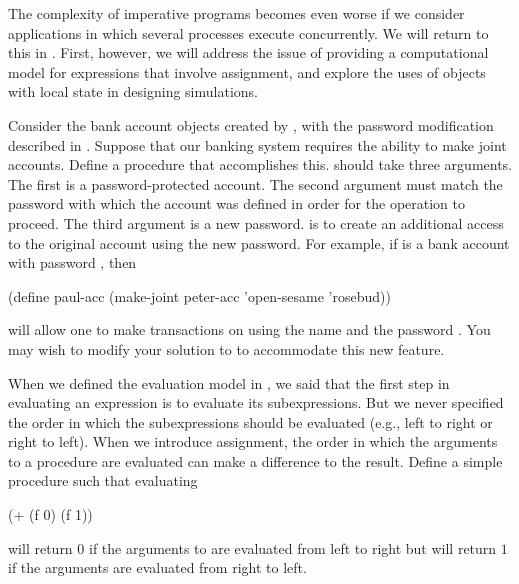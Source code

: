 The complexity of imperative programs becomes even worse if we consider applications in which several processes execute concurrently.
We will return to this in .
First, however, we will address the issue of providing a computational model for expressions that involve assignment, and explore the uses of objects with local state in designing simulations.

\begin{exercise}
	\label{Exercise 3.7}
	Consider the bank account objects created by , with the password modification described in .
	Suppose that our banking system requires the ability to make joint accounts.
	Define a procedure  that accomplishes this.
	 should take three arguments.
	The first is a password-protected account.
	The second argument must match the password with which the account was defined in order for the  operation to proceed.
	The third argument is a new password.
	 is to create an additional access to the original account using the new password.
	For example, if  is a bank account with password , then
	\begin{scheme}
	  (define paul-acc
	    (make-joint peter-acc 'open-sesame 'rosebud))
	\end{scheme}
	will allow one to make transactions on  using the name  and the password .
	You may wish to modify your solution to  to accommodate this new feature.
\end{exercise}



\begin{exercise}
	\label{Exercise 3.8}
	When we defined the evaluation model in , we said that the first step in evaluating an expression is to evaluate its subexpressions.
	But we never specified the order in which the subexpressions should be evaluated (e.g., left to right or right to left).
	When we introduce assignment, the order in which the arguments to a procedure are evaluated can make a difference to the result.
	Define a simple procedure  such that evaluating
	\begin{scheme}
	  (+ (f 0) (f 1))
	\end{scheme}
	will return \( 0 \) if the arguments to \code{+} are evaluated from left to right but will return \( 1 \) if the arguments are evaluated from right to left.
\end{exercise}
